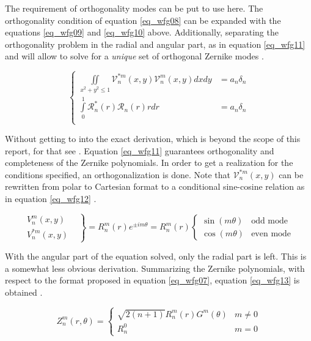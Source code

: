 \documentclass{article}
\begin{document}
The requirement of orthogonality modes can be put to use here. The orthogonality condition of equation \ref{eq_wfg08} can be expanded with the equations \ref{eq_wfg09} and \ref{eq_wfg10} above. Additionally, separating the orthogonality problem in the radial and angular part, as in equation \ref{eq_wfg11} and will allow to solve for a \textit{unique} set of orthogonal Zernike modes \cite{zernikeCircle}. 

\begin{equation}
\begin{cases}
\iint \limits_{x^2 + y^2 \leq 1} \mathcal{V}^{*m}_{n}(x,y) \mathcal{V}^{m}_{n}(x,y) dxdy &= a_n \delta_n  \\
\int \limits_0^1 \mathcal{R}^{*}_{n}(r) \mathcal{R}_{n}(r) r dr &= a_n \delta_n \\
\end{cases}
\label{eq_wfg11}
\end{equation}

Without getting to into the exact derivation, which is beyond the scope of this report, for that see \cite{zernikeCircle}. Equation \ref{eq_wfg11} guarantees orthogonality and completeness of the Zernike polynomials. In order to get a realization for the conditions specified, an orthogonalization is done. Note that $\mathcal{V}^{*m}_{n}(x,y)$ can be rewritten from polar to Cartesian format to a conditional sine-cosine relation as in equation \ref{eq_wfg12} \cite{zernikeMatlabPag}\cite{lectureNotes}\cite{zernikeCircle}.

\begin{equation}
\left.
\begin{matrix}
	V^{m}_{n}(x,y) & \\
	V^{*m}_{n}(x,y)
\end{matrix}
\right\rbrace =  R^{m}_{n}(r) e^{\pm i m \theta} =  R^{m}_{n}(r) 
\begin{cases}
	\sin(m\theta) &\text{odd mode}\\
	\cos(m\theta) &\text{even mode}
\end{cases}
\label{eq_wfg12}
\end{equation}

With the angular part of the equation solved, only the radial part is left. This is a somewhat less obvious derivation. Summarizing the Zernike polynomials, with respect to the format proposed in equation \ref{eq_wfg07}, equation \ref{eq_wfg13} is obtained \cite{zernikeMatlabPag}.

\begin{equation}
Z^{m}_{n}(r,\theta) = 
\begin{cases}
\sqrt{2(n+1)}R^{m}_{n}(r) G^{m}(\theta) & m \neq 0 \\
R^{0}_{n} & m = 0 
\end{cases}
\label{eq_wfg13}
\end{equation}
\end{document}
